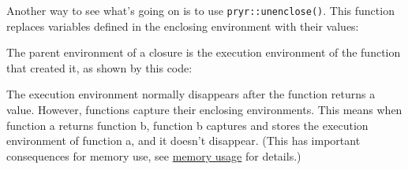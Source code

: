 \begin{Shaded}
\begin{Highlighting}[]
\NormalTok{(}
\NormalTok{(}
\end{Highlighting}
\end{Shaded}

Another way to see what's going on is to use \texttt{pryr::unenclose()}.
This function replaces variables defined in the enclosing environment
with their values:

\begin{Shaded}
\begin{Highlighting}[]
\CommentTok{#> \{}
\CommentTok{#> \}}
\CommentTok{#> \{}
\CommentTok{#> \}}
\end{Highlighting}
\end{Shaded}

The parent environment of a closure is the execution environment of the
function that created it, as shown by this code:

\begin{Shaded}
\begin{Highlighting}[]
\StringTok{ }
  \NormalTok{(}\NormalTok{())}
  \StringTok{ }
\NormalTok{\}}
\StringTok{ }\NormalTok{(}\NormalTok{)}
\end{Highlighting}
\end{Shaded}

The execution environment normally disappears after the function returns
a value. However, functions capture their enclosing environments. This
means when function a returns function b, function b captures and stores
the execution environment of function a, and it doesn't disappear. (This
has important consequences for memory use, see \hyperref[gc]{memory
usage} for details.)

